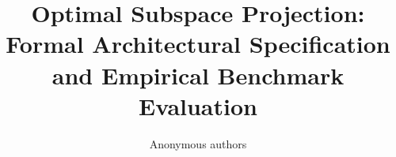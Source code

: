 \title{\textbf{Optimal Subspace Projection: Formal Architectural Specification and Empirical Benchmark Evaluation}}

\author{Anonymous authors}

